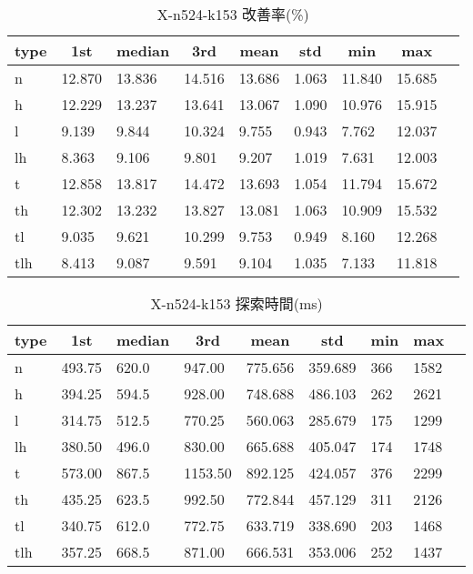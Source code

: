 \begin{table}[htbp]
    \centering
    \caption{X-n524-k153 改善率(\%)}
    \begin{tabular}{|l|l|l|l|l|l|l|l|l|}\hline
    \multicolumn{1}{|c|}{\textbf{type}}
    &\multicolumn{1}{|c|}{\textbf{1st}}
    &\multicolumn{1}{c|}{\textbf{median}}
    &\multicolumn{1}{c|}{\textbf{3rd}}
    &\multicolumn{1}{c|}{\textbf{mean}}
    &\multicolumn{1}{c|}{\textbf{std}}
    &\multicolumn{1}{c|}{\textbf{min}}
    &\multicolumn{1}{c|}{\textbf{max}}\\\hline
	n & 12.870 & 13.836 & 14.516 & 13.686 & 1.063 & 11.840 & 15.685\\\hline
	h & 12.229 & 13.237 & 13.641 & 13.067 & 1.090 & 10.976 & 15.915\\\hline
	l & 9.139 & 9.844 & 10.324 & 9.755 & 0.943 & 7.762 & 12.037\\\hline
	lh & 8.363 & 9.106 & 9.801 & 9.207 & 1.019 & 7.631 & 12.003\\\hline
	t & 12.858 & 13.817 & 14.472 & 13.693 & 1.054 & 11.794 & 15.672\\\hline
	th & 12.302 & 13.232 & 13.827 & 13.081 & 1.063 & 10.909 & 15.532\\\hline
	tl & 9.035 & 9.621 & 10.299 & 9.753 & 0.949 & 8.160 & 12.268\\\hline
	tlh & 8.413 & 9.087 & 9.591 & 9.104 & 1.035 & 7.133 & 11.818\\\hline
	\end{tabular}
\end{table}
\begin{table}[htbp]
    \centering
    \caption{X-n524-k153 探索時間(ms)}
    \begin{tabular}{|l|l|l|l|l|l|l|l|l|}\hline
    \multicolumn{1}{|c|}{\textbf{type}}
    &\multicolumn{1}{|c|}{\textbf{1st}}
    &\multicolumn{1}{c|}{\textbf{median}}
    &\multicolumn{1}{c|}{\textbf{3rd}}
    &\multicolumn{1}{c|}{\textbf{mean}}
    &\multicolumn{1}{c|}{\textbf{std}}
    &\multicolumn{1}{c|}{\textbf{min}}
    &\multicolumn{1}{c|}{\textbf{max}}\\\hline
	n & 493.75 & 620.0 & 947.00 & 775.656 & 359.689 & 366 & 1582\\\hline
	h & 394.25 & 594.5 & 928.00 & 748.688 & 486.103 & 262 & 2621\\\hline
	l & 314.75 & 512.5 & 770.25 & 560.063 & 285.679 & 175 & 1299\\\hline
	lh & 380.50 & 496.0 & 830.00 & 665.688 & 405.047 & 174 & 1748\\\hline
	t & 573.00 & 867.5 & 1153.50 & 892.125 & 424.057 & 376 & 2299\\\hline
	th & 435.25 & 623.5 & 992.50 & 772.844 & 457.129 & 311 & 2126\\\hline
	tl & 340.75 & 612.0 & 772.75 & 633.719 & 338.690 & 203 & 1468\\\hline
	tlh & 357.25 & 668.5 & 871.00 & 666.531 & 353.006 & 252 & 1437\\\hline
	\end{tabular}
\end{table}
